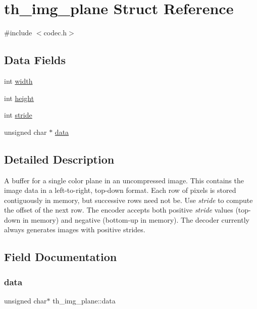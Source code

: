 \hypertarget{structth__img__plane}{}\section{th\+\_\+img\+\_\+plane Struct Reference}
\label{structth__img__plane}


{\ttfamily \#include $<$codec.\+h$>$}

\subsection*{Data Fields}
\begin{DoxyCompactItemize}
\item 
int \hyperlink{structth__img__plane_a58cc297a99cd4594c3d30e56f2ed6b74}{width}
\item 
int \hyperlink{structth__img__plane_a21aea1367894468de489d529d7eaf44d}{height}
\item 
int \hyperlink{structth__img__plane_ab1100f071ffee3b37e07e3222f819bad}{stride}
\item 
unsigned char $\ast$ \hyperlink{structth__img__plane_af8133681516ce88b5a201c1b4b7e6ba2}{data}
\end{DoxyCompactItemize}


\subsection{Detailed Description}
A buffer for a single color plane in an uncompressed image. This contains the image data in a left-\/to-\/right, top-\/down format. Each row of pixels is stored contiguously in memory, but successive rows need not be. Use {\itshape stride} to compute the offset of the next row. The encoder accepts both positive {\itshape stride} values (top-\/down in memory) and negative (bottom-\/up in memory). The decoder currently always generates images with positive strides. 

\subsection{Field Documentation}
\mbox{\label{structth__img__plane_af8133681516ce88b5a201c1b4b7e6ba2}} 
\subsubsection{\texorpdfstring{data}{data}}
{\footnotesize\ttfamily unsigned char$\ast$ th\+\_\+img\+\_\+plane\+::data}

